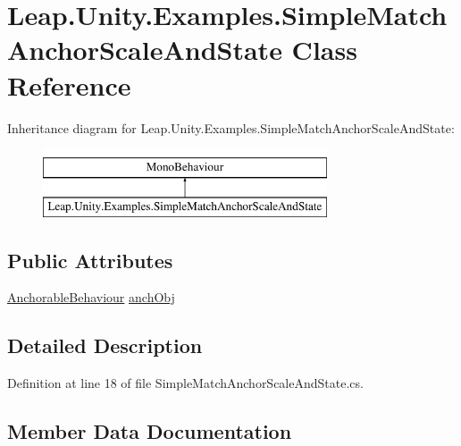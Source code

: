 \hypertarget{class_leap_1_1_unity_1_1_examples_1_1_simple_match_anchor_scale_and_state}{}\section{Leap.\+Unity.\+Examples.\+Simple\+Match\+Anchor\+Scale\+And\+State Class Reference}
\label{class_leap_1_1_unity_1_1_examples_1_1_simple_match_anchor_scale_and_state}
Inheritance diagram for Leap.\+Unity.\+Examples.\+Simple\+Match\+Anchor\+Scale\+And\+State\+:\begin{figure}[H]
\begin{center}
\leavevmode
\includegraphics[height=2.000000cm]{class_leap_1_1_unity_1_1_examples_1_1_simple_match_anchor_scale_and_state}
\end{center}
\end{figure}
\subsection*{Public Attributes}
\begin{DoxyCompactItemize}
\item 
\mbox{\hyperlink{class_leap_1_1_unity_1_1_interaction_1_1_anchorable_behaviour}{Anchorable\+Behaviour}} \mbox{\hyperlink{class_leap_1_1_unity_1_1_examples_1_1_simple_match_anchor_scale_and_state_a0ff3d950c261acf473ae89860cf91d15}{anch\+Obj}}
\end{DoxyCompactItemize}


\subsection{Detailed Description}


Definition at line 18 of file Simple\+Match\+Anchor\+Scale\+And\+State.\+cs.



\subsection{Member Data Documentation}
\mbox{\label{class_leap_1_1_unity_1_1_examples_1_1_simple_match_anchor_scale_and_state_a0ff3d950c261acf473ae89860cf91d15}} 
